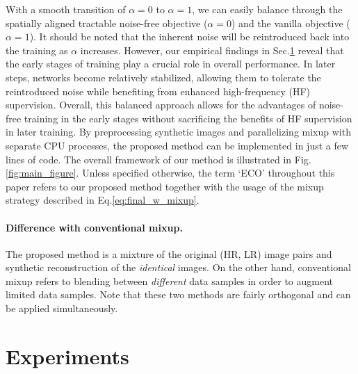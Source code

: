 \documentclass[letterpaper]{article} %
\begin{document}
With a smooth transition of $\alpha=0$ to $\alpha=1$, we can easily balance through the spatially aligned tractable noise-free objective ($\alpha=0$) and the vanilla objective ($\alpha=1$).
%
It should be noted that the inherent noise will be reintroduced back into the training as $\alpha$ increases.
%
%
However, our empirical findings in Sec.\ref{section:experiments} reveal that the early stages of training play a crucial role in overall performance. In later steps, networks become relatively stabilized, allowing them to tolerate the reintroduced noise while benefiting from enhanced high-frequency (HF) supervision.
Overall, this balanced approach allows for the advantages of noise-free training in the early stages without sacrificing the benefits of HF supervision in later training.
%
By preprocessing synthetic images and parallelizing mixup with separate CPU processes, the proposed method can be implemented in just a few lines of code.
%
The overall framework of our method is illustrated in Fig.\ref{fig:main_figure}. Unless specified otherwise, the term `ECO' throughout this paper refers to our proposed method together with the usage of the mixup strategy described in Eq.\eqref{eq:final_w_mixup}.


\paragraph{Difference with conventional mixup.}
The proposed method is a mixture of the original (HR, LR) image pairs and synthetic reconstruction of the \textit{identical} images. On the other hand, conventional mixup refers to blending between \textit{different} data samples in order to augment limited data samples.
Note that these two methods are fairly orthogonal and can be applied simultaneously.




\section{Experiments}\label{section:experiments}
\end{document}
